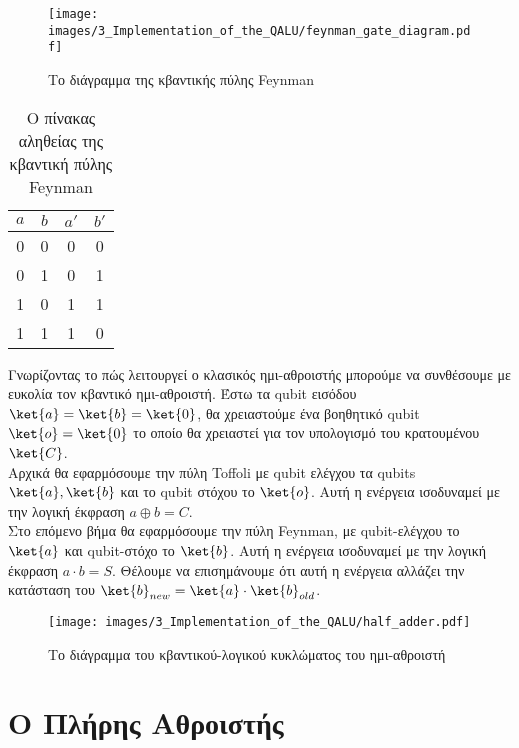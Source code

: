 \begin{figure}[ht]
    \centering
    \texttt{[image: images/3\_Implementation\_of\_the\_QALU/feynman\_gate\_diagram.pdf]}
    \label{fig:feynman_gate_diagram}
    \caption{Το διάγραμμα της κβαντικής πύλης Feynman}
\end{figure}

\begin{table}[ht]
    \centering
    \begin{tabular}{c c|c c}
        $a$ & $b$ & $a'$ & $b'$ \\
        \hline
        0 & 0 & 0 & 0 \\
        0 & 1 & 0 & 1 \\
        1 & 0 & 1 & 1 \\
        1 & 1 & 1 & 0 \\
    \end{tabular}
    \label{tab:truth_table_feynman}
    \caption{Ο πίνακας αληθείας της κβαντική πύλης Feynman}
\end{table}

Γνωρίζοντας το πώς λειτουργεί ο κλασικός ημι-αθροιστής
μπορούμε να συνθέσουμε με ευκολία τον κβαντικό ημι-αθροιστή.
Έστω τα qubit εισόδου $\ket{a} = \ket{b} = \ket{0}$, θα χρειαστούμε
ένα βοηθητικό qubit $\ket{o} = \ket{0}$ το οποίο θα χρειαστεί για
τον υπολογισμό του κρατουμένου $\ket{C}$.\\

Αρχικά θα εφαρμόσουμε την πύλη Toffoli με qubit ελέγχου τα qubits
$\ket{a}, \ket{b}$ και το qubit στόχου το $\ket{o}$. Αυτή η ενέργεια
ισοδυναμεί με την λογική έκφραση $a \oplus b = C$.\\

Στο επόμενο βήμα θα εφαρμόσουμε την πύλη Feynman, με qubit-ελέγχου
το $\ket{a}$ και qubit-στόχο το $\ket{b}$. Αυτή η ενέργεια
ισοδυναμεί με την λογική έκφραση $a \cdot b = S$. Θέλουμε να επισημάνουμε
ότι αυτή η ενέργεια αλλάζει την κατάσταση του $\ket{b}_{new} = \ket{a} \cdot \ket{b}_{old}$.\\

\begin{figure}[ht]
    \centering
    \texttt{[image: images/3\_Implementation\_of\_the\_QALU/half\_adder.pdf]}
    \label{fig:quantum_halfadder_diagram}
    \caption{Το διάγραμμα του κβαντικού-λογικού κυκλώματος του ημι-αθροιστή}
\end{figure}

\section{Ο Πλήρης Αθροιστής}

